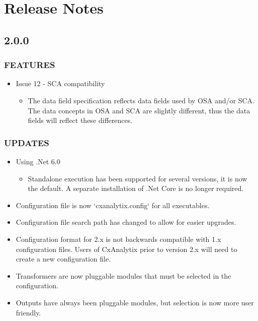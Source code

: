 \chapter{Release Notes}

\let\sectionold=\section

\renewcommand\thesection{v}

\section{2.0.0}

\subsection*{FEATURES}
    \begin{itemize}
        \item Issue 12 - SCA compatibility
        \begin{itemize}
            \item The data field specification reflects data fields used by OSA and/or SCA.  The data concepts in OSA and SCA 
            are slightly different, thus the data fields will reflect these differences.
        \end{itemize}
    \end{itemize}

\subsection*{UPDATES}
    \begin{itemize}
        \item Using .Net 6.0
            \begin{itemize}
                \item Standalone execution has been supported for several versions, it is now the default.  A separate installation of .Net Core is no longer required.
            \end{itemize}
        \item Configuration file is now `cxanalytix.config` for all executables.
        \item Configuration file search path has changed to allow for easier upgrades.
        \item Configuration format for 2.x is not backwards compatible with 1.x configuration files.  Users of CxAnalytix prior to version 2.x will need 
        to create a new configuration file.
        \item Transformers are now pluggable modules that must be selected in the configuration.
        \item Outputs have always been pluggable modules, but selection is now more user friendly.
    \end{itemize}

